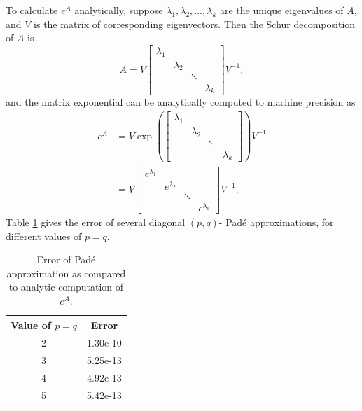 \documentclass{csri19}
\begin{document}
To calculate $e^A$ analytically, suppose $\lambda_1, \lambda_2, \dots, 
\lambda_k$ are the unique eigenvalues of $A$, and $V$ is the matrix of 
corresponding eigenvectors. Then the Schur decomposition of $A$ is 
\[A = V \begin{bmatrix} \lambda_1 &           &        &           \\
                                  & \lambda_2 &        &           \\
                                  &           & \ddots &           \\
                                  &           &        & \lambda_k \end{bmatrix}
 V^{-1},\] and the matrix exponential can be analytically computed to 
machine precision as
\begin{align*}
e^A &= V \exp\left(\begin{bmatrix} \lambda_1 &           &        &           \\
                                             & \lambda_2 &        &           \\
                                             &           & \ddots &           \\
                                             &           &        & \lambda_k \end{bmatrix}\right) V^{-1} \\
  &= V \begin{bmatrix} e^{\lambda_1} &               &        &               \\
                                     & e^{\lambda_2} &        &               \\
                                     &               & \ddots &               \\
                                     &               &        & e^{\lambda_k} \end{bmatrix} V^{-1}.
\end{align*}
Table \ref{CFK:tab:PadeError} gives the error of several diagonal $(p,q)$-
Pad\'e approximations, for different values of $p=q$.
\begin{table}[ht]
  \begin{center}
    \caption{Error of Pad\'e approximation as compared to analytic 
               computation of $e^A$.}
    \label{CFK:tab:PadeError}
    \begin{tabular}{|c|c|}
      \hline
      \textbf{Value of $p=q$} & \textbf{Error}\\
      \hline
      2 & 1.30e-10 \\
      3 & 5.25e-13 \\
      4 & 4.92e-13 \\
      5 & 5.42e-13 \\
      \hline
    \end{tabular}
  \end{center}
\end{table}
\end{document}
